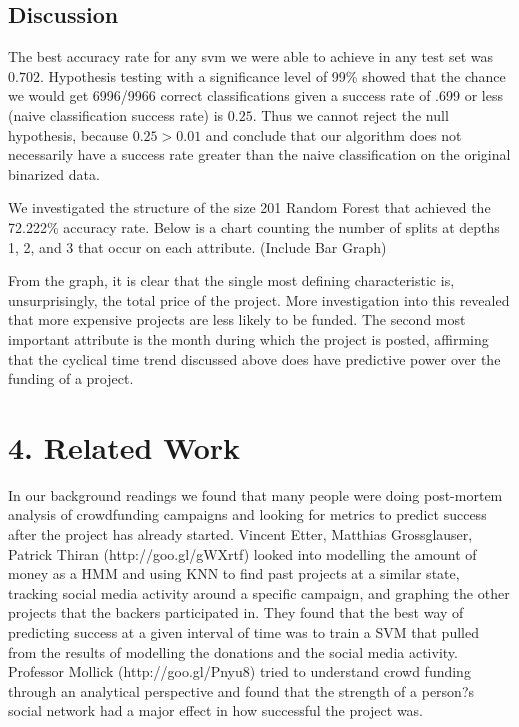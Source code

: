 \documentclass{article}
\begin{document}
\subsection{Discussion}

The best accuracy rate for any svm we were able to achieve in any test set was $0.702$. Hypothesis testing with a significance level of 99\% showed that the chance we would get 6996/9966 correct classifications given a success rate of .699 or less (naive classification success rate) is $0.25$. Thus we cannot reject the null hypothesis, because $0.25>0.01$ and conclude that our algorithm does not necessarily have a success rate greater than the naive classification on the original binarized data. 

We investigated the structure of the size 201 Random Forest that achieved the 72.222\% accuracy rate. Below is a chart counting the number of splits at depths 1, 2, and 3 that occur on each attribute.
(Include Bar Graph)

From the graph, it is clear that the single most defining characteristic is, unsurprisingly, the total price of the project. More investigation into this revealed that more expensive projects are less likely to be funded. The second most important attribute is the month during which the project is posted, affirming that the cyclical time trend discussed above does have predictive power over the funding of a project.

\section{4. Related Work}
In our background readings we found that many people were doing post-mortem analysis of crowdfunding campaigns and looking for metrics to predict success after the project has already started. Vincent Etter, Matthias Grossglauser, Patrick Thiran (http://goo.gl/gWXrtf) looked into modelling the amount of money as a HMM and using KNN to find past projects at a similar state, tracking social media activity around a specific campaign, and graphing the other projects that the backers participated in. They found that the best way of predicting success at a given interval of time was to train a SVM that pulled from the results of modelling the donations and the social media activity. Professor Mollick (http://goo.gl/Pnyu8) tried to understand crowd funding through an analytical perspective and found that the strength of a person?s social network had a major effect in how successful the project was. 
\end{document}
